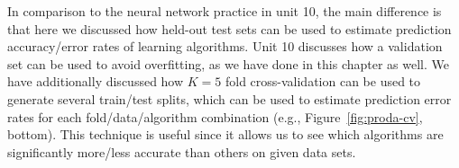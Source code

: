 \documentclass[12pt]{article}
\begin{document}
In comparison to the neural network practice in unit 10, the main
difference is that here we discussed how held-out test sets can be
used to estimate prediction accuracy/error rates of learning
algorithms. Unit 10 discusses how a validation set can be used to
avoid overfitting, as we have done in this chapter as well. We have
additionally discussed how $K=5$ fold cross-validation can be used to
generate several train/test splits, which can be used to estimate
prediction error rates for each fold/data/algorithm combination (e.g.,
Figure~\ref{fig:proda-cv}, bottom). This technique is useful since it
allows us to see which algorithms are significantly more/less accurate
than others on given data sets.


\end{document}
